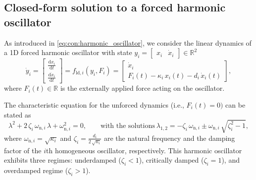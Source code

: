 \subsection{Closed-form solution to a forced harmonic oscillator}
As introduced in \eqref{eq:con:harmonic_oscillator}, we consider the linear dynamics of a 1D forced harmonic oscillator with state $y_{i} = \begin{bmatrix}
    x_i & \dot{x}_i
\end{bmatrix} \in \mathbb{R}^2$
\begin{equation}
    \dot{y}_i = \begin{bmatrix}
        \frac{\mathrm{d} x_i}{\mathrm{d} t}\\
        \frac{\mathrm{d} \dot{x}_i}{\mathrm{d} t}
    \end{bmatrix} = f_{\mathrm{ld},i}(y_{i}, F_{i}) = \begin{bmatrix}
        \dot{x}_i\\
        F_i(t) - \kappa_i \, x_i(t) - d_i \, \dot{x}_i(t)
    \end{bmatrix},
\end{equation}
where $F_i(t) \in \mathbb{R}$ is the externally applied force acting on the oscillator.

The characteristic equation for the unforced dynamics (i.e., $F_i(t) = 0)$ can be stated as~\cite{Pas2023damped}
\begin{equation}
    \lambda^2 + 2 \, \zeta_i \, \omega_{\mathrm{n},i}  \, \lambda + \omega_{\mathrm{n},i}^2 = 0,
    \qquad
    \text{with the solutions} \:
    \lambda_{1,2} = -\zeta_{i} \,  \omega_{\mathrm{n},i} \pm \omega_{\mathrm{n},i} \, \sqrt{\zeta_{i}^2 - 1},
\end{equation}
 where $\omega_{\mathrm{n},i} = \sqrt{\kappa_i}$ and $\zeta_i = \frac{d_i}{2 \, \sqrt{\kappa_i}}$ are the natural frequency and the damping factor of the $i$th homogeneous oscillator, respectively.
 This harmonic oscillator exhibits three regimes: underdamped ($\zeta_i < 1$), critically damped ($\zeta_i = 1$), and overdamped regime ($\zeta_i > 1$).

